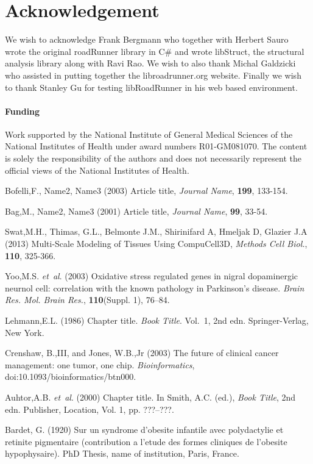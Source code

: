 \documentclass{bioinfo}
\begin{document}
\section*{Acknowledgement}
We wish to acknowledge Frank Bergmann who together with Herbert Sauro wrote the original roadRunner library in C\# and wrote libStruct, the structural analysis library along with Ravi Rao. We wish to also thank Michal Galdzicki who assisted in putting together the libroadrunner.org website. Finally we wish to thank Stanley Gu for testing libRoadRunner in his web based environment.

\paragraph{Funding\textcolon} Work supported by the National Institute of General Medical Sciences of the National Institutes of Health under award numbers R01-GM081070. The content is solely the responsibility of the authors and does not necessarily represent the official views of the National Institutes of Health.

%
%
%
%
%
%
%
%
%


\begin{thebibliography}{}
 Bofelli,F., Name2, Name3 (2003) Article title, {\it Journal Name}, {\bf 199}, 133-154.

 Bag,M., Name2, Name3 (2001) Article title, {\it Journal Name}, {\bf 99}, 33-54.

 Swat,M.H., Thimas, G.L., Belmonte J.M., Shirinifard A, Hmeljak D, Glazier J.A (2013) Multi-Scale Modeling of Tissues Using CompuCell3D, {\it Methods Cell Biol.}, {\bf 110}, 325-366.

Yoo,M.S. \textit{et~al}. (2003) Oxidative stress regulated genes
in nigral dopaminergic neurnol cell: correlation with the known
pathology in Parkinson's disease. \textit{Brain Res. Mol. Brain
Res.}, \textbf{110}(Suppl. 1), 76--84.

Lehmann,E.L. (1986) Chapter title. \textit{Book Title}. Vol.~1, 2nd edn. Springer-Verlag, New York.

Crenshaw, B.,III, and Jones, W.B.,Jr (2003) The future of clinical
cancer management: one tumor, one chip. \textit{Bioinformatics},
doi:10.1093/bioinformatics/btn000.

Auhtor,A.B. \textit{et~al}. (2000) Chapter title. In Smith, A.C.
(ed.), \textit{Book Title}, 2nd edn. Publisher, Location, Vol. 1, pp.
???--???.

Bardet, G. (1920) Sur un syndrome d'obesite infantile avec
polydactylie et retinite pigmentaire (contribution a l'etude des
formes cliniques de l'obesite hypophysaire). PhD Thesis, name of
institution, Paris, France.

\end{thebibliography}
\end{document}
